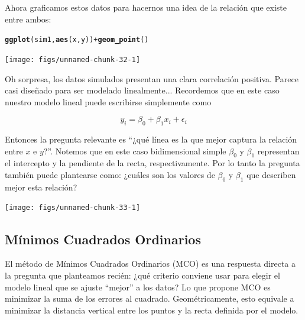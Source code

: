 \documentclass{article}\usepackage[]{graphicx}\usepackage[]{color}
\makeatletter
\newcommand{\hlopt}[1]{\textcolor[rgb]{0,0,0}{#1}}%
\newcommand{\hlstd}[1]{\textcolor[rgb]{0.345,0.345,0.345}{#1}}%
\newcommand{\hlkwd}[1]{\textcolor[rgb]{0.737,0.353,0.396}{\textbf{#1}}}%
\newenvironment{kframe}{%
 \def\at@end@of@kframe{}%
 \ifinner\ifhmode%
  \def\at@end@of@kframe{\end{minipage}}%
  \begin{minipage}{\columnwidth}%
 \fi\fi%
 \def\FrameCommand##1{\hskip\@totalleftmargin \hskip-\fboxsep
 \colorbox{shadecolor}{##1}\hskip-\fboxsep
     \hskip-\linewidth \hskip-\@totalleftmargin \hskip\columnwidth}%
 \MakeFramed {\advance\hsize-\width
   \@totalleftmargin\z@ \linewidth\hsize
   \@setminipage}}%
 {\par\unskip\endMakeFramed%
 \at@end@of@kframe}
\newenvironment{knitrout}{}{} %
\makeatother
\begin{document}
Ahora graficamos estos datos para hacernos una idea de la relación que existe entre ambos:

\begin{knitrout}
\color{fgcolor}\begin{kframe}
\begin{alltt}
\hlkwd{ggplot}\hlstd{(sim1,} \hlkwd{aes}\hlstd{(x, y))} \hlopt{+} \hlkwd{geom_point}\hlstd{()}
\end{alltt}
\end{kframe}

{\centering \texttt{[image: figs/unnamed-chunk-32-1]} 

}



\end{knitrout}

Oh sorpresa, los datos simulados presentan una clara correlación positiva. Parece casi diseñado para ser modelado linealmente...
Recordemos que en este caso nuestro modelo lineal puede escribirse simplemente como

\begin{equation*}
y_i = \beta_0 + \beta_1 x_i + \epsilon_i 
\end{equation*}

Entonces la pregunta relevante es ``¿qué línea es la que mejor captura la relación entre $x$ e $y$?''.
Notemos que en este caso bidimensional simple $\beta_0$ y $\beta_1$ representan el intercepto y la pendiente de la recta, respectivamente.
Por lo tanto la pregunta también puede plantearse como: ¿cuáles son los valores de $\beta_0$ y $\beta_1$ que describen mejor esta relación?


\begin{knitrout}
\color{fgcolor}

{\centering \texttt{[image: figs/unnamed-chunk-33-1]} 

}



\end{knitrout}

\subsection{Mínimos Cuadrados Ordinarios}

El método de Mínimos Cuadrados Ordinarios (MCO) es una respuesta directa a la pregunta que planteamos recién: ¿qué criterio conviene usar para elegir el modelo lineal que se ajuste ``mejor'' a los datos?
Lo que propone MCO es minimizar la suma de los errores al cuadrado.
Geométricamente, esto equivale a minimizar la distancia vertical entre los puntos y la recta definida por el modelo.
\end{document}
